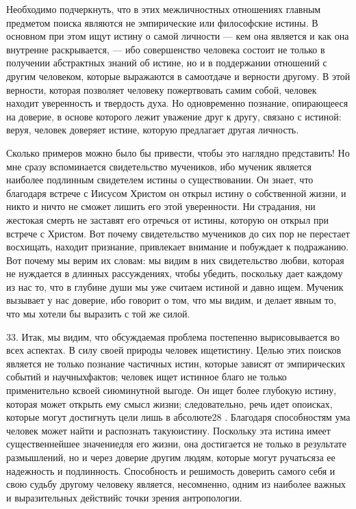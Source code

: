 \documentclass[a5paper,10pt]{article}
\begin{document}
Необходимо подчеркнуть, что в этих межличностных отношениях главным предметом
поиска являются не эмпирические или философские истины. В основном при этом
ищут истину о самой личности — кем она является и как она внутренне
раскрывается, — ибо совершенство человека состоит не только в получении
абстрактных знаний об истине, но и в поддержании отношений с другим человеком,
которые выражаются в самоотдаче и верности другому. В этой верности, которая
позволяет человеку пожертвовать самим собой, человек находит уверенность и
твердость духа. Но одновременно познание, опирающееся на доверие, в основе
которого лежит уважение друг к другу, связано с истиной: веруя, человек
доверяет истине, которую предлагает другая личность.

Сколько примеров можно было бы привести, чтобы это наглядно представить! Но мне
сразу вспоминается свидетельство мучеников, ибо мученик является наиболее
подлинным свидетелем истины о существовании. Он знает, что благодаря встрече с
Иисусом Христом он открыл истину о собственной жизни, и никто и ничто не сможет
лишить его этой уверенности. Ни страдания, ни жестокая смерть не заставят его
отречься от истины, которую он открыл при встрече с Христом. Вот почему
свидетельство мучеников до сих пор не перестает восхищать, находит признание,
привлекает внимание и побуждает к подражанию. Вот почему мы верим их словам: мы
видим в них свидетельство любви, которая не нуждается в длинных рассуждениях,
чтобы убедить, поскольку дает каждому из нас то, что в глубине души мы уже
считаем истиной и давно ищем. Мученик вызывает у нас доверие, ибо говорит о
том, что мы видим, и делает явным то, что мы хотели бы выразить с той же силой.

33. Итак, мы видим, что обсуждаемая проблема постепенно вырисовывается во всех
аспектах. В силу своей природы человек ищетистину. Целью этих поисков является
не только познание частичных истин, которые зависят от эмпирических событий и
научныхфактов; человек ищет истинное благо не только применительно ксвоей
сиюминутной выгоде. Он ищет более глубокую истину, которая может открыть ему
смысл жизни; следовательно, речь идет опоисках, которые могут достигнуть цели
лишь в абсолюте28 . Благодаря способностям ума человек может найти и распознать
такуюистину. Поскольку эта истина имеет существеннейшее значениедля его жизни,
она достигается не только в результате размышлений, но и через доверие другим
людям, которые могут ручатьсяза ее надежность и подлинность. Способность и
решимость доверить самого себя и свою судьбу другому человеку является,
несомненно, одним из наиболее важных и выразительных действийс точки зрения
антропологии.
\end{document}
